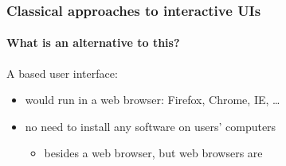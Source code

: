 \documentclass{beamer}
\begin{document}
\begin{frame}
    \frametitle{Classical approaches to interactive UIs}
    \framesubtitle{What is an alternative to this?}

    A  based user interface:
    \begin{itemize}
        \item would run in a web browser: Firefox, Chrome, IE, \ldots
        \item no need to install any software on users' computers
            \begin{itemize}
                \item besides a web browser, but web browsers are 
            \end{itemize}
    \end{itemize}
\end{frame}
\end{document}
